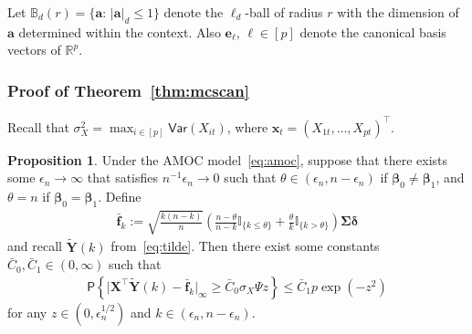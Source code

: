 \documentclass[11pt, a4paper]{article}
\newcommand{\mbf}{\mathbf}
\newcommand{\eps}{\epsilon}
\renewcommand{\l}{\left}
\renewcommand{\r}{\right}
\def\wt{\widetilde}
\newcommand{\cp}{\theta}
\newcommand{\Var}[0]{\mathsf{Var}}
\newcommand{\p}{\mathsf{P}}
\newcommand{\R}{\mathbb{R}}
\theoremstyle{definition}
\theoremstyle{definition}
\theoremstyle{definition}
\theoremstyle{definition}
\newtheorem{prop}[thm]{Proposition}
\theoremstyle{definition}
\theoremstyle{remark}
\theoremstyle{definition}
\theoremstyle{definition}
\theoremstyle{definition}
\begin{document}
Let $\mathbb{B}_d(r) = \{\mbf a: \, \vert \mbf a \vert_d \le 1\}$ denote the $\ell_d$-ball of radius $r$ with the dimension of $\mbf a$ determined within the context. 
Also $\mbf e_\ell, \, \ell \in [p]$ denote the canonical basis vectors of $\R^p$.

\subsubsection{Proof of Theorem~\ref{thm:mcscan}}

Recall that $\sigma_X^2 = \max_{i \in [p]} \Var(X_{it})$, where $\mbf x_t = (X_{1t}, \ldots, X_{pt})^\top$.

\begin{prop}
\label{prop:sparse}
Under the AMOC model~\eqref{eq:amoc}, suppose that there exists some $\eps_n \to \infty$ that satisfies $n^{-1} \eps_n \to 0$ such that $\cp \in (\eps_n, n - \eps_n)$ if $\bm\beta_0 \neq\bm\beta_1$, and $\cp = n$ if $\bm\beta_0 = \bm\beta_1$. 
Define \begin{align}
\bar{\mbf f}_k := \sqrt{\frac{k (n - k)}{n}} \l( \frac{n - \cp}{n - k} \mathbb{I}_{\{k \le \cp\}} + \frac{\cp}{k} \mathbb{I}_{\{k > \cp\}} \r) \bm\Sigma \bm\delta
\label{eq:f:bar}
\end{align}
and recall $\wt{\mbf Y}(k)$ from~\eqref{eq:tilde}. Then there exist some constants $\bar{C}_0, \bar{C}_1 \in (0, \infty)$ such that
\begin{align*}
\p\l\{ \vert \mbf X^\top \wt{\mbf Y}(k) - \bar{\mbf f}_k \vert_\infty \ge \bar{C}_0 \sigma_X \Psi z \r\} \le \bar{C}_1 p \exp(-z^2)
\end{align*}
for any $z \in (0, \eps_n^{1/2})$ and $k \in (\eps_n, n - \eps_n)$.
\end{prop}
\end{document}

